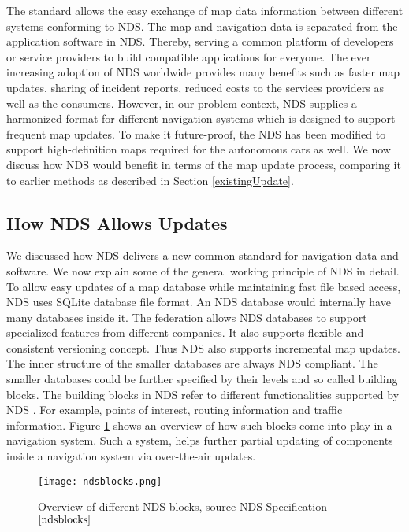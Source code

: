 The standard allows the easy exchange of map data information between different systems conforming to NDS. The map and navigation data is separated from the application software in NDS. Thereby, serving a common platform of developers or service providers to build compatible applications for everyone. The ever increasing adoption of NDS worldwide provides many benefits such as faster map updates, sharing of incident reports, reduced costs to the services providers as well as the consumers. However, in our problem context, NDS supplies a harmonized format for different navigation systems which is designed to support frequent map updates. To make it future-proof, the NDS has been modified to support high-definition maps required for the autonomous cars as well. We now discuss how NDS would benefit in terms of the map update process, comparing it to earlier methods as described in Section \ref{existingUpdate}. 

\subsection{How NDS Allows Updates}
We discussed how NDS delivers a new common standard for navigation data and software. We now explain some of the general working principle of NDS in detail. To allow easy updates of a map database while maintaining fast file based access, NDS uses SQLite database file format. An NDS database would internally have many databases inside it. The federation allows NDS databases to support specialized features from different companies. It also supports flexible and consistent versioning concept. Thus NDS also supports incremental map updates. The inner structure of the smaller databases are always NDS compliant. The smaller databases could be further specified by their levels and so called building blocks. The building blocks in NDS refer to different functionalities supported by NDS \cite{ndsblocks}. For example, points of interest, routing information and traffic information. Figure \ref{fig:ndsblocks} shows an overview of how such blocks come into play in a navigation system. Such a system, helps further partial updating of components inside a navigation system via over-the-air updates.  \\
\begin{figure}
\texttt{[image: ndsblocks.png]}
\label{fig:ndsblocks}
\caption{Overview of different NDS blocks, source NDS-Specification$\cite{ndsblocks}$}
\end{figure}


